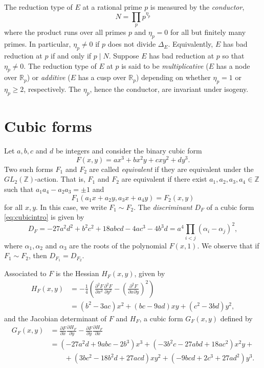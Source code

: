 The reduction type of $E$ at a rational prime $p$ is measured by the \textit{conductor}, 
\[N = \prod_{p}p^{\eta_p}\]
where the product runs over all primes $p$ and $\eta_p = 0$ for all but finitely many primes. In particular, $\eta_p \neq 0$ if $p$ does not divide $\Delta_E$. Equivalently, $E$ has bad reduction at $p$ if and only if $p \mid N$. Suppose $E$ has bad reduction at $p$ so that $\eta_p \neq 0$. The reduction type of $E$ at $p$ is said to be \textit{multiplicative} ($E$ has a node over $\mathbb{R}_p$) or \textit{additive} ($E$ has a cusp over $\mathbb{R}_p$) depending on whether $\eta_p = 1$ or $\eta_p \geq 2$, respectively. The $\eta_p$, hence the conductor, are invariant under isogeny. 


\section{Cubic forms}
\label{sec:CubicForms}

Let $a,b,c$ and $d$ be integers and consider the binary cubic form
\begin{equation} \label{eq:cubicintro}
F(x,y) = ax^3 + bx^2y + cxy^2 + dy^3.
\end{equation}
Two such forms $F_1$ and $F_2$ are called \textit{equivalent} if they are equivalent under the $GL_{2}(\mathbb{Z})$-action. That is, $F_1$ and $F_2$ are equivalent if there exist $a_1, a_2, a_3, a_4 \in \mathbb{Z}$ such that $a_1a_4 - a_2a_3 = \pm 1$ and 
\[F_1(a_1x + a_2y, a_3x + a_4y) = F_2(x,y)\]
for all $x,y$. In this case, we write $F_1 \sim F_2$. The \textit{discriminant} $D_F$ of a cubic form \eqref{eq:cubicintro} is given by 
\[D_F = -27a^2d^2 + b^2c^2 + 18abcd - 4ac^3 - 4b^3d = a^4 \prod_{i < j} (\alpha_i - \alpha_j)^2,\]
where $\alpha_1, \alpha_2$ and $\alpha_3$ are the roots of the polynomial $F(x,1)$. We observe that if $F_1 \sim F_2$, then $D_{F_1} = D_{F_2}$. 

Associated to $F$ is the Hessian $H_F(x,y)$, given by
\begin{align*}
H_F(x,y) & = -\frac{1}{4}\left( \frac{\partial^2F}{\partial x^2} \frac{\partial^2F}{\partial y^2} - \left(\frac{\partial^2F}{\partial x \partial y}\right)^2\right)\\
& = (b^2 - 3ac)x^2 + (bc - 9ad)xy + (c^2 - 3bd)y^2,
\end{align*}
and the Jacobian determinant of $F$ and $H_F$, a cubic form $G_F(x,y)$ defined by
\begin{align*}
G_F(x,y) &= \frac{\partial F}{\partial x} \frac{\partial H_F}{\partial y} - \frac{\partial F}{\partial y} \frac{\partial H_F}{\partial x} \\
& =  (-27a^2d + 9abc -2b^3)x^3 + (-3b^2c - 27abd + 18ac^2)x^2y +  \\
& \quad \quad + (3bc^2 - 18b^2d + 27acd)xy^2 + (-9bcd + 2c^3 + 27ad^2)y^3.
\end{align*}

